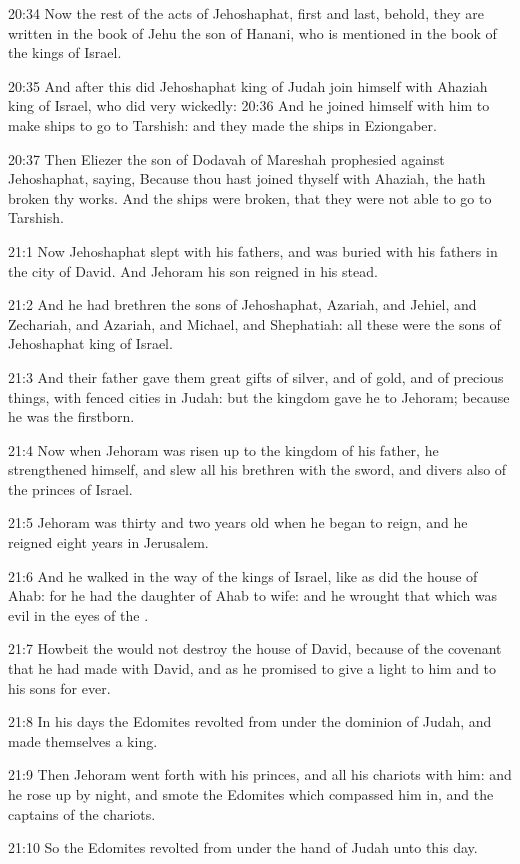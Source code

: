 20:34 Now the rest of the acts of Jehoshaphat, first and last, behold,
they are written in the book of Jehu the son of Hanani, who is
mentioned in the book of the kings of Israel.

20:35 And after this did Jehoshaphat king of Judah join himself with
Ahaziah king of Israel, who did very wickedly: 20:36 And he joined
himself with him to make ships to go to Tarshish: and they made the
ships in Eziongaber.

20:37 Then Eliezer the son of Dodavah of Mareshah prophesied against
Jehoshaphat, saying, Because thou hast joined thyself with Ahaziah,
the \LORD hath broken thy works. And the ships were broken, that they
were not able to go to Tarshish.

21:1 Now Jehoshaphat slept with his fathers, and was buried with his
fathers in the city of David. And Jehoram his son reigned in his
stead.

21:2 And he had brethren the sons of Jehoshaphat, Azariah, and Jehiel,
and Zechariah, and Azariah, and Michael, and Shephatiah: all these
were the sons of Jehoshaphat king of Israel.

21:3 And their father gave them great gifts of silver, and of gold,
and of precious things, with fenced cities in Judah: but the kingdom
gave he to Jehoram; because he was the firstborn.

21:4 Now when Jehoram was risen up to the kingdom of his father, he
strengthened himself, and slew all his brethren with the sword, and
divers also of the princes of Israel.

21:5 Jehoram was thirty and two years old when he began to reign, and
he reigned eight years in Jerusalem.

21:6 And he walked in the way of the kings of Israel, like as did the
house of Ahab: for he had the daughter of Ahab to wife: and he wrought
that which was evil in the eyes of the \LORD.

21:7 Howbeit the \LORD would not destroy the house of David, because of
the covenant that he had made with David, and as he promised to give a
light to him and to his sons for ever.

21:8 In his days the Edomites revolted from under the dominion of
Judah, and made themselves a king.

21:9 Then Jehoram went forth with his princes, and all his chariots
with him: and he rose up by night, and smote the Edomites which
compassed him in, and the captains of the chariots.

21:10 So the Edomites revolted from under the hand of Judah unto this
day.

